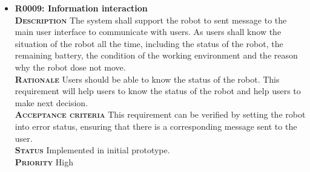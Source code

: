 \documentclass[11pt, a4paper]{article}
\begin{document}
\begin{itemize}
\item {\bfseries R0009: Information interaction}\\
\textsc{\bfseries Description} The system shall support the robot to sent message to the main user interface to communicate with users. As users shall know the situation of the robot all the time, including the status of the robot, the remaining battery, the condition of the working environment and the reason why the robot dose not move.\\
\textsc{\bfseries Rationale} Users should be able to know the status of the robot. This requirement will help users to know the status of the robot and help users to make next decision.\\
\textsc{\bfseries Acceptance criteria} This requirement can be verified by setting the robot into error status, ensuring that there is a corresponding message sent to the user.\\
\textsc{\bfseries Status} Implemented in initial prototype.\\
\textsc{\bfseries Priority} High\\
\end{itemize}
\end{document}
